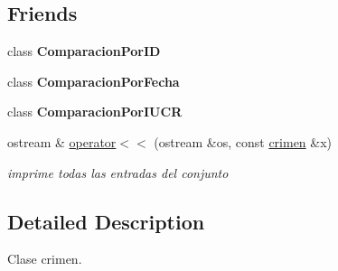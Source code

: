 \subsection*{Friends}
\begin{DoxyCompactItemize}
\item 
\hypertarget{classcrimen_a1039d77117f29044e0af31583df42c8d}{class {\bfseries Comparacion\-Por\-I\-D}}\label{classcrimen_a1039d77117f29044e0af31583df42c8d}

\item 
\hypertarget{classcrimen_a679c6b369e5a97cb011d5033025becc0}{class {\bfseries Comparacion\-Por\-Fecha}}\label{classcrimen_a679c6b369e5a97cb011d5033025becc0}

\item 
\hypertarget{classcrimen_aea542a37de4c308a39f605a69b0f2778}{class {\bfseries Comparacion\-Por\-I\-U\-C\-R}}\label{classcrimen_aea542a37de4c308a39f605a69b0f2778}

\item 
ostream \& \hyperlink{classcrimen_a4984d9a6773993c33ba40b80b3c09c72}{operator$<$$<$} (ostream \&os, const \hyperlink{classcrimen}{crimen} \&x)
\begin{DoxyCompactList}\small\item\em imprime todas las entradas del conjunto \end{DoxyCompactList}\end{DoxyCompactItemize}


\subsection{Detailed Description}
Clase crimen. 

